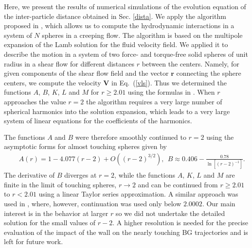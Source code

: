 Here, we present the results of numerical simulations of the evolution equation of the inter-particle distance obtained in Sec. \ref{dista}. We apply the algorithm proposed in \cite{Filippov2000}, which allows us to
compute the hydrodynamic interactions in a system of $N$ spheres in a creeping flow. The algorithm is based on the multipole expansion of the Lamb solution for the fluid velocity field. We applied it to describe the motion in a system of two force- and torque-free solid spheres of unit radius in a shear flow for different distances $r$ between
the centers. Namely, for given components of the shear flow field and the vector
$\bm r$ connecting the sphere centers, we compute the velocity $\bm V$ in Eq.~(\ref{vls}).
Thus we determined the functions $A$, $B$, $K$, $L$ and $M$ for $r\geq 2.01$ using
the formulas in \cite{batchelor_green_1972}. When $r$ approaches the value $r=2$ the algorithm requires  a very large number of spherical harmonics into the solution expansion, which leads to a very large system of linear equations for the coefficients of the harmonics.

The functions $A$ and $B$ were therefore smoothly continued to $r=2$ using the asymptotic forms for almost touching spheres given by
\begin{eqnarray}&&\!\!\!\!\!\!\!\!\!\!\!\!\!\!\!\!
A(r)=1-4.077 (r-2)+O((r-2)^{3/2}),\ \
B\approx 0.406-\frac{0.78}{\ln \left[(r-2)^{-1}\right]}.
\label{tou}
\end{eqnarray}
The derivative of $B$ diverges at $r=2$, while the functions $A$, $K$, $L$ and $M$ are finite in the limit of touching spheres, $r\to 2$ and can be continued from $r\geq 2.01$ to $r<2.01$ using a linear Taylor series approximation. A similar approach was used in \cite{arp}, where, however, continuation was used only below $2.0002$. Our main interest is in the behavior at larger $r$ so we did not undertake the detailed solution for the small values of $r-2$. A higher resolution is needed for the precise evaluation of the impact of the wall on the nearly touching BG trajectories and is left for future work.


